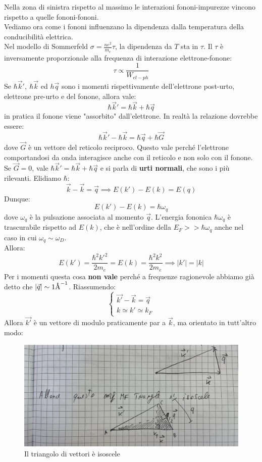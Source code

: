 \documentclass{book}
\begin{document}
        Nella zona di sinistra rispetto al massimo le interazioni fononi-impurezze vincono rispetto a quelle fononi-fononi.\\
        Vediamo ora come i fononi influenzano la dipendenza dalla temperatura della conducibilità elettrica.\\
        Nel modello di Sommerfeld $\sigma = \displaystyle \frac{n e^{2}}{m_{e}}\tau $, la dipendenza da $T$ sta in $\tau$. Il $\tau$ è inversamente proporzionale alla frequenza di interazione elettrone-fonone:
        $$\tau \propto \frac{1}{W_{el-ph}}$$
        Se $\hbar \vec{k}', \ \hbar \vec{k}$ ed $h \vec{q}$ sono i momenti rispettivamente dell'elettrone post-urto, elettrone pre-urto e del fonone, allora vale:
        $$\hbar \vec{k} ' = \hbar \vec{k} +\hbar \vec{q}$$
        in pratica il fonone viene "assorbito" dall'elettrone. In realtà la relazione dovrebbe essere:
        $$\hbar \vec{k} ' - \hbar \vec{k} = \hbar \vec{q} + \hbar \vec{G}$$
        dove $\vec{G}$ è un vettore del reticolo reciproco. Questo vale perché l'elettrone comportandosi da onda interagisce anche con il reticolo e non solo con il fonone.\\
        Se $\vec{G} = 0$, vale $\hbar \vec{k} ' = \hbar \vec{k}+\hbar \vec{q}$ e si parla di \textbf{urti normali}, che sono i più rilevanti.
        Elidiamo $\hbar$:
        $$\vec{k}-\vec{k} = \vec{q} \implies E(k') - E(k) = E(q)$$
        Dunque:
        $$E(k') -E(k) =  \hbar \omega_{q}$$
        dove $\omega_{q}$ è la pulsazione associata al momento $\vec{q}$.
        L'energia fononica $\hbar \omega_{q}$ è trascurabile rispetto ad $E(k)$, che è nell'ordine della $E_{F} >> \hbar \omega_{q}$ anche nel caso in cui $\omega_{q} \sim \omega_{D}$.\\
        Allora:
        $$E(k') = \frac{\hbar ^{2} k'^{2}}{2m_{e}} = E(k) = \frac{\hbar ^{2}k^{2}}{2m_{e}} \implies |k'| = |k|$$
        Per i momenti questa cosa \textbf{non vale} perché a frequenze ragionevole abbiamo già detto che $|\vec{q}| \sim 1 \textrm{\si{\angstrom}} ^{-1}$.
        Riassumendo:
        $$\begin{cases}
            \vec{k'}-\vec{k} = \vec{q} \\
            k \simeq k' \simeq k_{F}
        \end{cases}$$
        Allora $\vec{k'}$ è un vettore di modulo praticamente par a $\vec{k}$, ma orientato in tutt'altro modo:
        \begin{figure}[h!]
            \centering
            \includegraphics[width=0.85\linewidth]{img/pippo.png}
            \caption{Il triangolo di vettori è isoscele}
        \end{figure}
\end{document}
